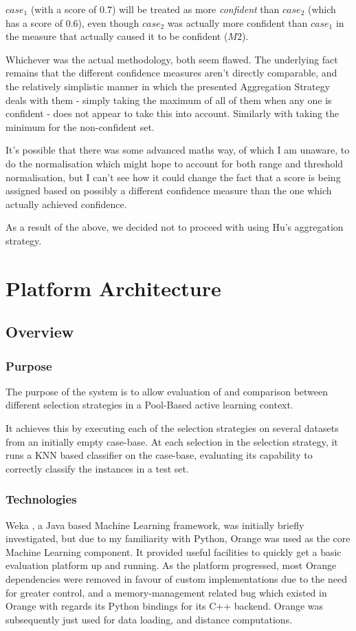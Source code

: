 \documentclass[a4paper,11pt]{report}
\begin{document}
\begin{enumerate}
	$case_{1}$ (with a score of $0.7$) will be treated as more \emph{confident} than $case_{2}$ (which has a score of $0.6$), even though $case_{2}$ was actually more confident than $case_{1}$ in the measure that actually caused it to be confident ($M2$).
	
\end{enumerate}

Whichever was the actual methodology, both seem flawed. The underlying fact remains that the different confidence measures aren't directly comparable, and the relatively simplistic manner in which the presented Aggregation Strategy deals with them - simply taking the maximum of all of them when any one is confident - does not appear to take this into account. Similarly with taking the minimum for the non-confident set.

It's possible that there was some advanced maths way, of which I am unaware, to do the normalisation which might hope to account for both range and threshold normalisation, but I can't see how it could change the fact that a score is being assigned based on possibly a different confidence measure than the one which actually achieved confidence.

As a result of the above, we decided not to proceed with using Hu's aggregation strategy.

\chapter{Platform Architecture\label{cha:platarch}}
\section{Overview}
\subsection{Purpose}
The purpose of the system is to allow evaluation of and comparison between different selection strategies in a Pool-Based active learning context.

It achieves this by executing each of the selection strategies on several datasets from an initially empty case-base. At each selection in the selection strategy, it runs a KNN based classifier on the case-base, evaluating its capability to correctly classify the instances in a test set.

\subsection{Technologies}
Weka \citep{prog:weka}, a Java based Machine Learning framework, was initially briefly investigated, but due to my familiarity with Python, Orange \citep{prog:orange} was used as the core Machine Learning component. It provided useful facilities to quickly get a basic evaluation platform up and running. As the platform progressed, most Orange dependencies were removed in favour of custom implementations due to the need for greater control, and a memory-management related bug which existed in Orange with regards its Python bindings for its C++ backend. Orange was subsequently just used for data loading, and distance computations.
\end{document}
